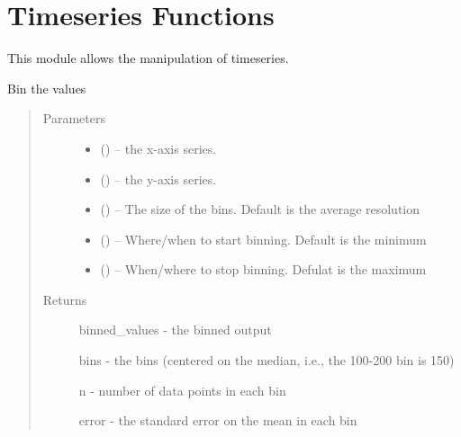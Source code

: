 \documentclass[letterpaper,10pt,english]{sphinxmanual}
\begin{document}
\chapter{Timeseries Functions}
\label{\detokenize{Timeseries:timeseries-functions}}\label{\detokenize{Timeseries::doc}}
This module allows the manipulation of timeseries.

\begin{fulllineitems}
\label{\detokenize{Timeseries:pyleoclim.Timeseries.bin}}
Bin the values
\begin{quote}\begin{description}
\item[{Parameters}] \leavevmode\begin{itemize}
\item {} 
 () -- the x-axis series.

\item {} 
 () -- the y-axis series.

\item {} 
 () -- The size of the bins. Default is the average resolution

\item {} 
 () -- Where/when to start binning. Default is the minimum

\item {} 
 () -- When/where to stop binning. Defulat is the maximum

\end{itemize}

\item[{Returns}] \leavevmode

binned\_values - the binned output

bins - the bins (centered on the median, i.e., the 100-200 bin is 150)

n - number of data points in each bin

error -  the standard error on the mean in each bin


\end{description}\end{quote}

\end{fulllineitems}
\end{document}
